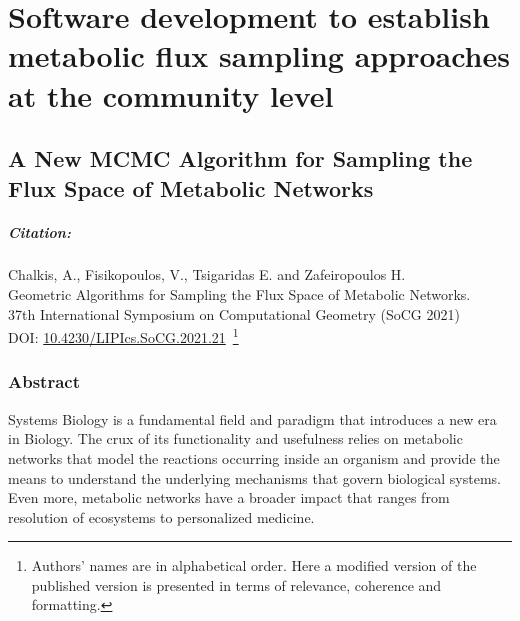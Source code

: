 % 
% 



\newtheorem{thm}{Theorem}
\newtheorem{lem}[thm]{Lemma}
\newtheorem{remark}[thm]{Remark}


\chapter{Software development to establish metabolic flux sampling 
         approaches at the community level}
\label{cha:dingo}


\section{A New MCMC Algorithm for Sampling the Flux Space of
Metabolic Networks}

\paragraph{Citation:}
Chalkis, A., Fisikopoulos, V., Tsigaridas E. and Zafeiropoulos H.\\ 
Geometric Algorithms for Sampling the Flux Space of Metabolic Networks. \\ 
37th International Symposium on Computational Geometry (SoCG 2021) \\ 
DOI: \href{https://drops.dagstuhl.de/opus/volltexte/2021/13820/}{10.4230/LIPIcs.SoCG.2021.21}~\footnote{
   Authors' names are in alphabetical order. 
   Here a modified version of the published version is presented
   in terms of relevance, coherence and formatting.
}


\subsection{Abstract}
\label{sec:mmcs-abstract}

   Systems Biology is a fundamental field and paradigm that introduces a new era in Biology.
   The crux of its functionality and usefulness relies on metabolic networks
   that model the reactions occurring inside an organism
   and provide the means to understand the underlying mechanisms that govern biological systems.
   Even more, metabolic networks have a broader impact that ranges from
   resolution of ecosystems to personalized medicine.

